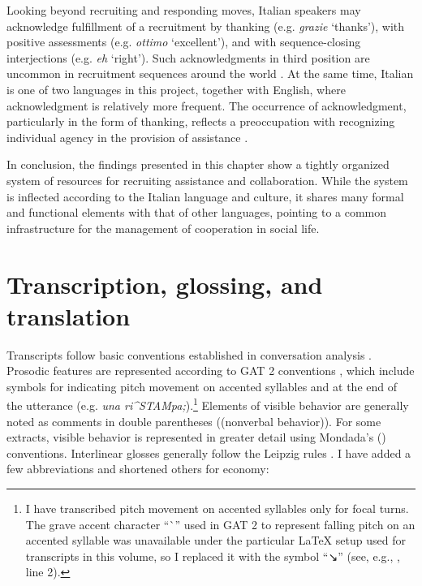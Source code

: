 \documentclass[output=paper,modfonts]{langscibook}
\begin{document}
Looking beyond recruiting and responding moves, Italian speakers may acknowledge fulfillment of a recruitment by thanking (e.g. \textit{grazie} ‘thanks’), with positive assessments (e.g. \textit{ottimo} ‘excellent’), and with sequence-closing interjections (e.g. \textit{eh} ‘right’). Such acknowledgments in third position are uncommon in recruitment sequences around the world \citep{FloydEtAl2018}. At the same time, Italian is one of two languages in this project, together with English, where acknowledgment is relatively more frequent. The occurrence of acknowledgment, particularly in the form of thanking, reflects a preoccupation with recognizing individual agency in the provision of assistance \citep{ZinkenRossiReddy}. %

In conclusion, the findings presented in this chapter show a tightly organized system of resources for recruiting assistance and collaboration. While the system is inflected according to the Italian language and culture, it shares many formal and functional elements with that of other languages, pointing to a common infrastructure for the management of cooperation in social life. %

\section*{Transcription, glossing, and translation}

Transcripts follow basic conventions established in conversation analysis \citep{jefferson_glossary_2004,HepburnBolden2013}. Prosodic features are represented according to GAT 2 conventions \citep{couper-kuhlen_system_2011}, which include symbols for indicating pitch movement on accented syllables and at the end of the utterance (e.g. \textit{una ri\^{}STAMpa;}).\footnote{I have transcribed pitch movement on accented syllables only for focal turns. The grave accent character “\`{}” used in GAT 2 to represent falling pitch on an accented syllable was unavailable under the particular LaTeX setup used for transcripts in this volume, so I replaced it with the symbol “↘” (see, e.g., , line 2).} Elements of visible behavior are generally noted as comments in double parentheses ((nonverbal behavior)). For some extracts, visible behavior is represented in greater detail using Mondada's (\citeyear{Mondada2019}) conventions. Interlinear glosses generally follow the Leipzig rules \citep{comrie_leipzig_2020}. I have added a few abbreviations and shortened others for economy:\medskip
\end{document}

